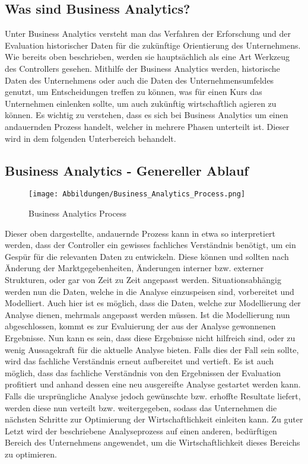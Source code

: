 \documentclass[12pt,twocolumn,twoside]{conference}   %
\begin{document}
\subsection{Was sind Business Analytics?}
Unter Business Analytics versteht man das Verfahren der Erforschung und der Evaluation  historischer Daten für die zukünftige Orientierung des Unternehmens.  Wie bereits oben beschrieben, werden sie hauptsächlich als eine Art Werkzeug des Controllers gesehen. Mithilfe der Business Analytics werden, historische Daten des Unternehmens oder auch die Daten des Unternehmensumfeldes genutzt, um Entscheidungen treffen zu können, was für einen Kurs das Unternehmen einlenken sollte, um auch zukünftig wirtschaftlich agieren zu können. Es wichtig zu verstehen, dass es sich bei Business Analytics um einen andauernden Prozess handelt, welcher in mehrere Phasen unterteilt ist. Dieser wird in dem folgenden Unterbereich behandelt.

\subsection{Business Analytics - Genereller Ablauf}

\begin{figure}[H]
\centering
\texttt{[image: Abbildungen/Business\_Analytics\_Process.png]}
\caption{Business Analytics Process}\label{visina8}
\end{figure}

Dieser oben dargestellte, andauernde Prozess kann in etwa so interpretiert werden, dass der Controller ein gewisses fachliches Verständnis benötigt, um ein Gespür für die relevanten Daten zu entwickeln. Diese können und sollten nach Änderung der Marktgegebenheiten, Änderungen interner bzw. externer Strukturen, oder gar von Zeit zu Zeit angepasst werden. Situationsabhängig werden nun die Daten, welche in die Analyse einzuspeisen sind, vorbereitet und Modelliert. Auch hier ist es möglich, dass die Daten, welche zur Modellierung der Analyse dienen, mehrmals angepasst werden müssen. Ist die Modellierung nun abgeschlossen, kommt es zur Evaluierung der aus der Analyse gewonnenen Ergebnisse. Nun kann es sein, dass diese Ergebnisse nicht hilfreich sind, oder zu wenig Aussagekraft für die aktuelle Analyse bieten. Falls dies der Fall sein sollte, wird das fachliche Verständnis erneut aufbereitet und vertieft. Es ist auch möglich, dass das fachliche Verständnis von den Ergebnissen der Evaluation profitiert und anhand dessen eine neu ausgereifte Analyse gestartet werden kann. Falls die ursprüngliche Analyse jedoch gewünschte bzw. erhoffte Resultate liefert, werden diese nun verteilt bzw. weitergegeben, sodass das Unternehmen die nächsten Schritte zur Optimierung der Wirtschaftlichkeit einleiten kann. Zu guter Letzt wird der beschriebene Analyseprozess auf einen anderen, bedürftigen Bereich des Unternehmens angewendet, um die Wirtschaftlichkeit dieses Bereichs zu optimieren.
\end{document}
